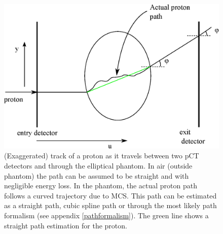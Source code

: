 \documentclass[11pt,a4paper]{article}
\begin{document}



\begin{figure}[!h]
\centering
\includegraphics[scale=0.5]{img/mostlikelypath.eps}
\caption{(Exaggerated) track of a proton as it travels between two pCT detectors and through the elliptical phantom. In air (outside phantom) the path can be assumed to be straight and with negligible energy loss. In the phantom, the actual proton path follows a curved trajectory due to MCS. This path can be estimated as a straight path, cubic spline path or through the most likely path formalism (see appendix \ref{pathformalism}). The green line shows a straight path estimation for the proton.}
\label{fig:mlpphantom}
\end{figure}
\end{document}
